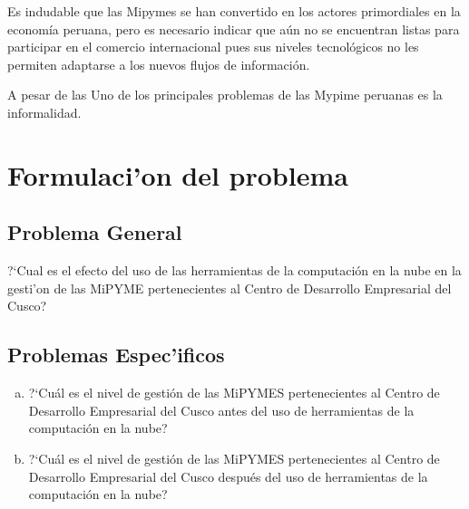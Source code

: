 Es indudable que las Mipymes se han convertido en los actores primordiales en la
econom\'ia peruana, pero es necesario indicar que a\'un no se encuentran listas
para participar en el comercio internacional pues sus niveles tecnol\'ogicos no
les permiten adaptarse a los nuevos flujos de informaci\'on.

A pesar de las Uno de los principales problemas de las Mypime peruanas es la informalidad.

\section{Formulaci'on del problema}
\subsection{Problema General}
?`Cual es el efecto del uso de las herramientas de la computaci\'on en la nube
en la gesti'on de las MiPYME pertenecientes al Centro de Desarrollo Empresarial
del Cusco?
\subsection{Problemas Espec'ificos}
\begin{enumerate}[a.]
\item ?`Cu\'al es el nivel de gesti\'on de las MiPYMES pertenecientes al Centro
de Desarrollo Empresarial del Cusco antes del uso de herramientas de la computaci\'on
en la nube?
\item ?`Cu\'al es el nivel de gesti\'on de las MiPYMES pertenecientes al Centro
de Desarrollo Empresarial del Cusco despu\'es del uso de herramientas de la computaci\'on
en la nube?
\end{enumerate}
%
%
